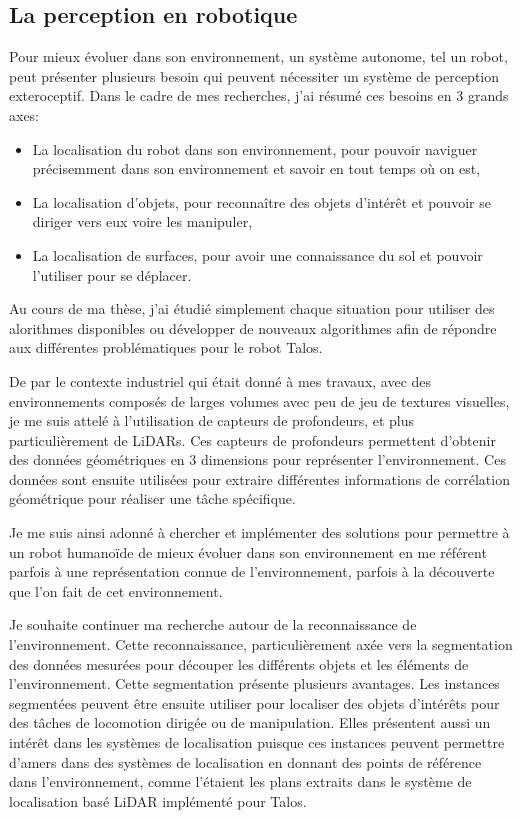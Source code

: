 \documentclass[11pt,a4paper,sans]{moderncv}         %
\begin{document}
\subsection{La perception en robotique}

Pour mieux évoluer dans son environnement, un système autonome, tel un robot, peut présenter plusieurs besoin qui peuvent nécessiter un système de perception exteroceptif. Dans le cadre de mes recherches, j'ai résumé ces besoins en 3 grands axes:
\begin{itemize}
  \item La localisation du robot dans son environnement, pour pouvoir naviguer précisemment dans son environnement et savoir en tout temps où on est,
  \item La localisation d'objets, pour reconnaître des objets d'intérêt et pouvoir se diriger vers eux voire les manipuler,
  \item La localisation de surfaces, pour avoir une connaissance du sol et pouvoir l'utiliser pour se déplacer.
\end{itemize}

Au cours de ma thèse, j'ai étudié simplement chaque situation pour utiliser des alorithmes disponibles ou développer de nouveaux algorithmes afin de répondre aux différentes problématiques pour le robot Talos.

De par le contexte industriel qui était donné à mes travaux, avec des environnements composés de larges volumes avec peu de jeu de textures visuelles, je me suis attelé à l'utilisation de capteurs de profondeurs, et plus particulièrement de LiDARs. Ces capteurs de profondeurs permettent d'obtenir des données géométriques en 3 dimensions pour représenter l'environnement. Ces données sont ensuite utilisées pour extraire différentes informations de corrélation géométrique pour réaliser une tâche spécifique.

Je me suis ainsi adonné à chercher et implémenter des solutions pour permettre à un robot humanoïde de mieux évoluer dans son environnement en me référent parfois à une représentation connue de l'environnement, parfois à la découverte que l'on fait de cet environnement.

Je souhaite continuer ma recherche autour de la reconnaissance de l'environnement. Cette reconnaissance, particulièrement axée vers la segmentation des données mesurées pour découper les différents objets et les éléments de l'environnement. Cette segmentation présente plusieurs avantages. Les instances segmentées peuvent être ensuite utiliser pour localiser des objets d'intérêts pour des tâches de locomotion dirigée ou de manipulation. Elles présentent aussi un intérêt dans les systèmes de localisation puisque ces instances peuvent permettre d'amers dans des systèmes de localisation en donnant des points de référence dans l'environnement, comme l'étaient les plans extraits dans le système de localisation basé LiDAR implémenté pour Talos.
\end{document}

